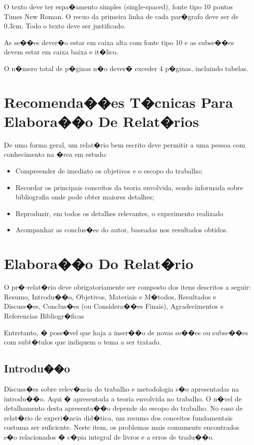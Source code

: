 \documentclass[conference]{IEEEtran}
\begin{document}
O texto deve ter espa�amento simples (single-spaced), fonte tipo 10 pontos Times New Roman. O recuo da primeira linha de cada par�grafo deve ser de 0.3cm. Todo o texto deve ser justificado.

As se��es dever�o estar em caixa alta com fonte tipo 10 e as subse��es devem estar em caixa baixa e it�lico.

O n�mero total de p�ginas n�o dever� exceder 4  p�ginas, incluindo tabelas.

\section{Recomenda��es T�cnicas Para Elabora��o De Relat�rios}

De uma forma geral, um relat�rio bem escrito deve permitir a uma pessoa com conhecimento na �rea em estudo:
\begin{itemize}
\item Compreender de imediato os objetivos e o escopo do trabalho;
\item Recordar os principais conceitos da teoria envolvida, sendo informada sobre bibliografia onde pode obter maiores detalhes;
\item Reproduzir, em todos os detalhes relevantes, o experimento realizado
\item Acompanhar as conclus�es do autor, baseadas nos resultados obtidos.
\end{itemize}
	

\section{Elabora��o Do Relat�rio}

O pr�-relat�rio deve obrigatoriamente ser composto dos itens descritos a seguir: Resumo, Introdu��o,	Objetivos, Materiais e M�todos, Resultados e Discuss�es, Conclus�es (ou Considera��es Finais), Agradecimentos e Referencias Bibliogr�ficas

Entretanto, � poss�vel que haja a inser��o de novas se��es ou subse��es com subt�tulos que indiquem o tema a ser tratado.

\subsection{Introdu��o}

Discuss�es sobre relev�ncia do trabalho e metodologia s�o apresentadas na introdu��o. Aqui � apresentada a teoria envolvida no trabalho. O n�vel de detalhamento desta apresenta��o depende do escopo do trabalho. No caso de relat�rio de experi�ncia did�tica, um resumo dos conceitos fundamentais costuma ser suficiente. Neste item, os problemas mais comumente encontrados s�o relacionados � c�pia integral de livros e a erros de tradu��o.
\end{document}
